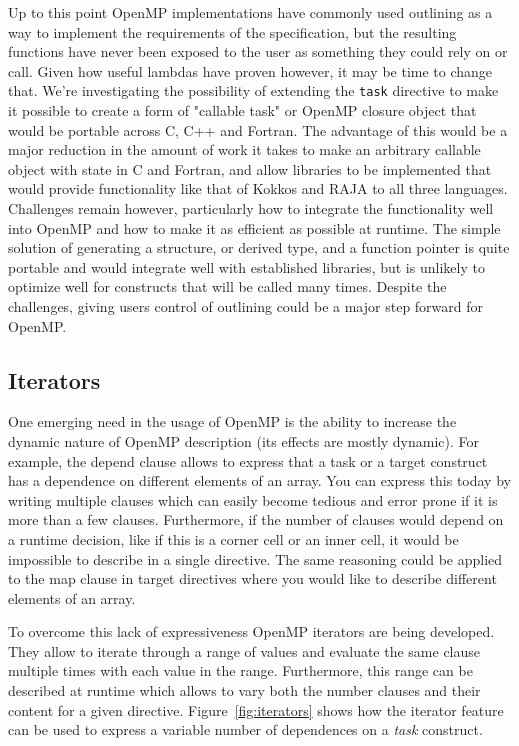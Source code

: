 Up to this point OpenMP implementations have commonly used outlining as a way to
implement the requirements of the specification, but the resulting functions
have never been exposed to the user as something they could rely on or call.
Given how useful lambdas have proven however, it may be time to change that.
We're investigating the possibility of extending the \texttt{task} directive to
make it possible to create a form of "callable task" or OpenMP closure object
that would be portable across C, C++ and Fortran.  The advantage of this would
be a major reduction in the amount of work it takes to make an arbitrary
callable object with state in C and Fortran, and allow libraries to be
implemented that would provide functionality like that of Kokkos and RAJA to all
three languages.  Challenges remain however, particularly how to integrate the
functionality well into OpenMP and how to make it as efficient as possible at
runtime.  The simple solution of generating a structure, or derived type, and
a function pointer is quite portable and would integrate well with established
libraries, but is unlikely to optimize well for constructs that will be called
many times.  Despite the challenges, giving users control of outlining could be
a major step forward for OpenMP.

\subsection{Iterators}
\label{sub:iterators}

One emerging need in the usage of OpenMP is the ability to increase the dynamic
nature of OpenMP description (its effects are mostly dynamic). For example, the
depend clause allows to express that a task or a target construct has
a dependence on different elements of an array. You can express this today by
writing multiple clauses which can easily become tedious and error prone if it
is more than a few clauses. Furthermore, if the number of clauses would depend
on a runtime decision, like if this is a corner cell or an inner cell, it would
be impossible to describe in a single directive. The same reasoning could be
applied to the map clause in target directives where you would like to describe
different elements of an array.
   
To overcome this lack of expressiveness OpenMP iterators are being developed.
They allow to iterate through a range of values and evaluate the same clause
multiple times with each value in the range. Furthermore, this range can be
described at runtime which allows to vary both the number clauses and their
content for a given directive. Figure~\ref{fig:iterators} shows how the iterator
feature can be used to express a variable number of dependences on a \emph{task}
construct.

